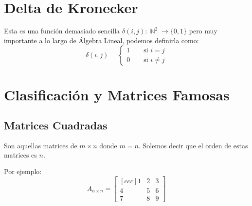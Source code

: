 \documentclass[12pt, fleqn]{report}                             %
\DeclareMathOperator \Space     {\quad}                         %
\theoremstyle{break}                                            %
\DeclareMathOperator \Naturals     {\mathbb{N}}                 %
\begin{document}
        \vspace{1em}
        \section{Delta de Kronecker}

            Esta es una función demasiado sencilla $\delta(i,j): \Naturals^2 \to \{0,1\}$
            pero muy importante a lo largo de Álgebra Lineal, podemos definirla como:
            \begin{equation*}
                \delta(i,j) =
                \begin{cases}
                    1 \Space \text{ si } i = j      \\
                    0 \Space \text{ si } i \neq j
                \end{cases}
            \end{equation*}



        \clearpage
        \section{Clasificación y Matrices Famosas}

            \subsection{Matrices Cuadradas}

                Son aquellas matrices de $m \times n$ donde $m = n$.
                Solemos decir que el orden de estas matrices es $n$.

                Por ejemplo: 
                \begin{equation*}
                    A_{n \times n} =
                    \begin{bmatrix}[ccc]
                        1 & 2 & 3 \\
                        4 & 5 & 6 \\
                        7 & 8 & 9
                    \end{bmatrix}
                \end{equation*}
\end{document}
